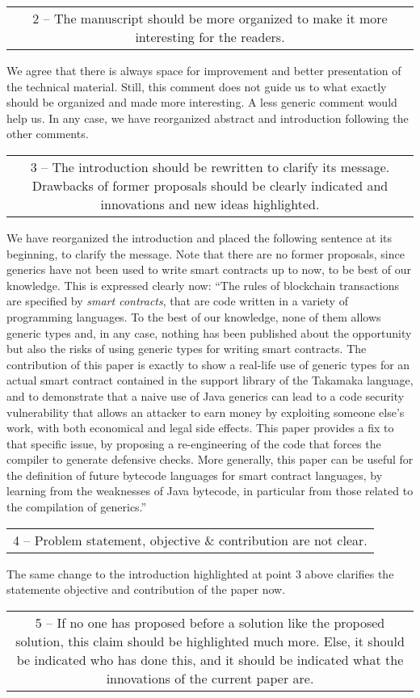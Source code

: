 \documentclass[journal,onecolumn, 11pt]{IEEEtran}
\newcommand{\BOX}[1]
{
  {\it
    \begin{center}
      \begin{tabular}{|c|}
        \hline
        \parbox{0.97\columnwidth}{
          \medskip
          #1
          \medskip} \\
        \hline
      \end{tabular}
    \end{center}
  }
}
\begin{document}
\BOX{
2 -- The manuscript should be more organized to make it more interesting for the readers.
}

We agree that there is always space for improvement and better presentation of the technical material. Still, this comment does not guide us to what exactly should be organized and made more interesting. A less generic comment would help us. In any case, we have reorganized abstract and introduction following the other comments.


\BOX{
3 -- The introduction should be rewritten to clarify its message. Drawbacks of former proposals should be clearly indicated and innovations and new ideas highlighted.
}

We have reorganized the introduction and placed the following sentence at its beginning, to clarify the message. Note that there are no former proposals, since generics have not been used to write smart contracts up to now, to be best of our knowledge. This is expressed clearly now:
``The rules of blockchain transactions are specified by \emph{smart contracts},
that are code written in a variety of programming languages. To the best of our knowledge, none of them allows generic types and, in any case,
nothing has been published about the opportunity but also the risks of using generic types for writing smart contracts.
The contribution of this paper is exactly to show a real-life
use of generic types for an actual smart contract contained in the support
library of the Takamaka language,
and to demonstrate that a naive use
of Java generics can lead to a code security vulnerability that
allows an attacker to earn money by exploiting someone else's work, with both economical and legal side effects.
This paper provides a fix to that specific issue,
by proposing a re-engineering of the code that forces the compiler to generate defensive checks.
More generally, this paper can be useful for the definition of
future bytecode languages for smart contract languages, by
learning from the weaknesses of Java bytecode, in particular from those related to the
compilation of generics.''


\BOX{
4 -- Problem statement, objective \& contribution are not clear.
}

The same change to the introduction highlighted at point 3 above clarifies the statemente objective and contribution of the paper now.

\BOX{
5 -- If no one has proposed before a solution like the proposed solution, this claim should be highlighted much more. Else, it should be indicated who has done this, and it should be indicated what the innovations of the current paper are.
}
\end{document}
